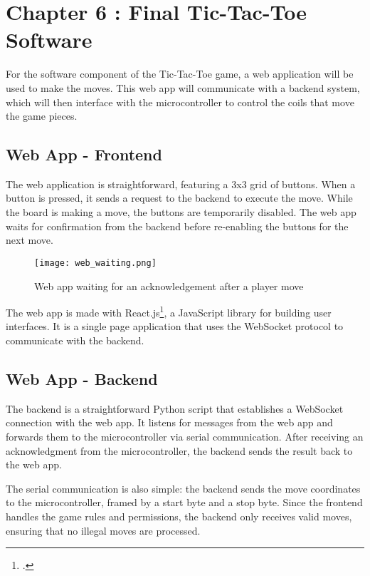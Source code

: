 \chapter{Chapter 6 : Final Tic-Tac-Toe Software}

For the software component of the Tic-Tac-Toe game, a web application will be used to make the moves. This web app will communicate with a backend system, which will then interface with the microcontroller to control the coils that move the game pieces.

\section{Web App - Frontend}

The web application is straightforward, featuring a 3x3 grid of buttons. When a button is pressed, it sends a request to the backend to execute the move. While the board is making a move, the buttons are temporarily disabled. The web app waits for confirmation from the backend before re-enabling the buttons for the next move.

\begin{figure}[H]
	\centering
	\texttt{[image: web\_waiting.png]}
	\caption[Web app waiting for an acknowledgement after a player move]{Web app waiting for an acknowledgement after a player move}
	\label{fig:web_waiting}
\end{figure}

The web app is made with React.js\footcite{noauthor_react_nodate}, a JavaScript library for building user interfaces. It is a single page application that uses the WebSocket protocol to communicate with the backend.

\section{Web App - Backend}

The backend is a straightforward Python script that establishes a WebSocket connection with the web app. It listens for messages from the web app and forwards them to the microcontroller via serial communication. After receiving an acknowledgment from the microcontroller, the backend sends the result back to the web app.

The serial communication is also simple: the backend sends the move coordinates to the microcontroller, framed by a start byte and a stop byte. Since the frontend handles the game rules and permissions, the backend only receives valid moves, ensuring that no illegal moves are processed.

